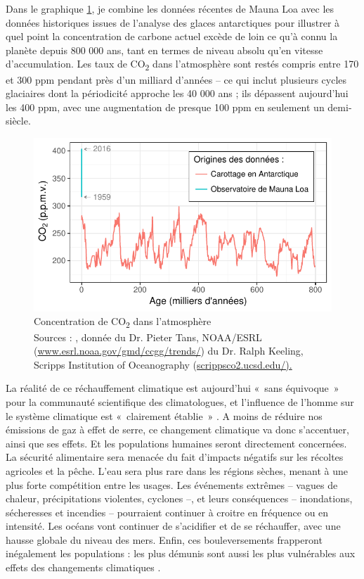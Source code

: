 Dans le graphique \ref{fig:CO2Emissions}, je combine les données récentes de Mauna Loa avec les données historiques issues de l'analyse des glaces antarctiques pour illustrer à quel point la concentration de carbone actuel excède de loin ce qu'à connu la planète depuis 800 000 ans, tant en termes de niveau absolu qu'en vitesse d'accumulation. Les taux de CO\textsubscript{2} dans l'atmosphère sont restés compris entre 170 et 300 ppm pendant près d'un milliard d'années -- ce qui inclut plusieurs cycles glaciaires dont la périodicité approche les 40 000 ans ; ils dépassent aujourd'hui les 400 ppm, avec une augmentation de presque 100 ppm en seulement un demi-siècle.

\begin{figure}[!ht]
	\centering
	\includegraphics{figures/CO2Emissions.pdf}
	\caption[Concentration de CO\textsubscript{2} dans l'atmosphère]{Concentration de CO\textsubscript{2} dans l'atmosphère \\ Sources : \citet{Luthi2008}, donnée du Dr. Pieter Tans, NOAA/ESRL (\url{www.esrl.noaa.gov/gmd/ccgg/trends/}) du Dr. Ralph Keeling, Scripps Institution of Oceanography (\url{scrippsco2.ucsd.edu/).}}
	\label{fig:CO2Emissions}
\end{figure}

La réalité de ce réchauffement climatique est aujourd’hui «~sans équivoque~» pour la communauté scientifique des climatologues, et l'influence de l'homme sur le système climatique est «~clairement établie~» \citep{IPCC2014}.
A moins de réduire nos émissions de gaz à effet de serre, ce changement climatique va donc s’accentuer, ainsi que ses effets. Et les populations humaines seront directement concernées. La sécurité alimentaire sera menacée du fait d’impacts négatifs sur les récoltes agricoles et la pêche. L’eau sera plus rare dans les régions sèches, menant à une plus forte compétition entre les usages. Les événements extrêmes -- vagues de chaleur, précipitations violentes, cyclones --, et leurs conséquences -- inondations, sécheresses et incendies -- pourraient continuer à croitre en fréquence ou en intensité. Les océans vont continuer de s’acidifier et de se réchauffer, avec une hausse globale du niveau des mers. 
Enfin, ces bouleversements frapperont inégalement les populations : les plus démunis sont aussi les plus vulnérables aux effets des changements climatiques \citep{IPCC2014}.


